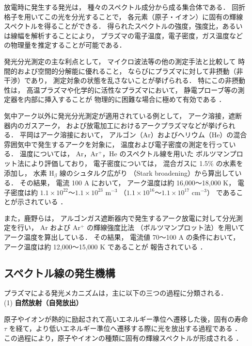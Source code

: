 \documentclass[dvipdfmx,report,uplatex]{jsbook}
\numberwithin{equation}{section}
\numberwithin{figure}{section}
\numberwithin{table}{section}
\begin{document}
放電時に発生する発光は，
種々のスペクトル成分から成る集合体である．
回折格子を用いてこの光を分光することで，
各元素（原子・イオン）に固有の輝線スペクトルを得ることができる．
得られたスペクトルの強度，強度比，あるいは線幅を解析することにより，
プラズマの電子温度，電子密度，ガス温度などの物理量を推定することが可能である．

発光分光測定の主な利点として，
マイクロ波法等の他の測定手法と比較して
時間的および空間的分解能に優れること，
ならびにプラズマに対して非摂動（非干渉）であり，
測定対象の状態を乱さないことが挙げられる．
特にこの非摂動性は，
高温プラズマや化学的に活性なプラズマにおいて，
静電プローブ等の測定器を内部に挿入することが
物理的に困難な場合に極めて有効である
\cite{YamamotoMurayama1995}．

気中アーク以外に発光分光測定が適用されている例として，
アーク溶接，遮断器内のガスアーク，
および放電加工におけるアークプラズマなどが挙げられる．
平岡はアーク溶接において，
アルゴン（Ar）およびヘリウム（He）の混合雰囲気中で発生するアークを対象に，
温度および電子密度の測定を行っている．
温度については，
Ar，Ar$^{+}$，He のスペクトル線を用いた
ボルツマンプロット法により評価しており，
電子密度については，
混合ガスに 1.5\% の水素を添加し，
水素 H$_{\beta}$ 線のシュタルク広がり
（Stark broadening）から算出している．
その結果，
電流 100 A において，
アーク温度は約 16,000～18,000 K，
電子密度は約
$1.1\times10^{22}$～$1.1\times10^{23}$ m$^{-3}$
（$1.1\times10^{16}$～$1.1\times10^{17}$ cm$^{-3}$）
であることが示されている
\cite{平岡和雄1993混合ガスシールドアークプラズマの発光分光特性とその解析}．

また，鹿野らは，
アルゴンガス遮断器内で発生するアーク放電に対して分光測定を行い，
Ar および Ar$^{+}$ の輝線強度比法
（ボルツマンプロット法）を用いて
アーク温度を算出している．
その結果，
電流値 70～100 A の条件において，
アーク温度は約 12,000～15,000 K であることが
報告されている
\cite{鹿野竜大2019マイクロ秒分光計測を用いたアーク温度計測}．

\subsection{スペクトル線の発生機構}
プラズマによる発光メカニズムは，主に以下の三つの過程に分類される．\\

(1) \textbf{自然放射（自発放出）}  

原子やイオンが熱的に励起されて高いエネルギー準位へ遷移した後，固有の寿命 $\tau$ を経て，より低いエネルギー準位へ遷移する際に光を放出する過程である
\cite{YamamotoMurayama1995,DaidojiNakahara1996,KinoshitaOtaNagaiMinami2015}．
この過程により，原子やイオンの種類に固有の輝線スペクトルが形成される
\cite{YamamotoMurayama1995,KinoshitaOtaNagaiMinami2015}．\\
\end{document}
